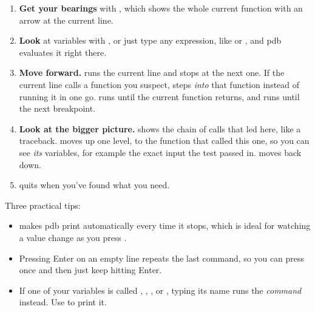 \documentclass[10pt,a4paper]{article}
\begin{document}
\begin{enumerate}
\item \textbf{Get your bearings} with , which shows the whole current function with an arrow at the current line.
\item \textbf{Look} at variables with , or just type any expression, like  or , and pdb evaluates it right there.
\item \textbf{Move forward.}  runs the current line and stops at the next one. If the current line calls a function you suspect,  steps \emph{into} that function instead of running it in one go.  runs until the current function returns, and  runs until the next breakpoint.
\item \textbf{Look at the bigger picture.}  shows the chain of calls that led here, like a traceback.  moves up one level, to the function that called this one, so you can see \emph{its} variables, for example the exact input the test passed in.  moves back down.
\item {} quits when you’ve found what you need.
\end{enumerate}
Three practical tips:
\begin{itemize}
\item {} makes pdb print  automatically every time it stops, which is ideal for watching a value change as you press .
\item Pressing Enter on an empty line repeats the last command, so you can press  once and then just keep hitting Enter.
\item If one of your variables is called , , ,  or , typing its name runs the \emph{command} instead. Use  to print it.
\end{itemize}
\end{document}
